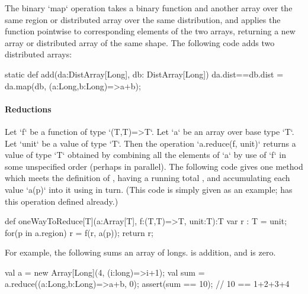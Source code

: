 The binary \xcd`map` operation takes a binary function and
another
array over the same region or distributed array over the same  distribution,
and applies the function 
pointwise to corresponding elements of the two arrays, returning
a new array or distributed array of the same shape.
The following code adds two distributed arrays: 
\begin{xten}
static def add(da:DistArray[Long], db: DistArray[Long])
    {da.dist==db.dist}
    = da.map(db, (a:Long,b:Long)=>a+b);
\end{xten}



\paragraph{Reductions}\label{ArrayReductions}

Let \xcd`f` be a function of type \xcd`(T,T)=>T`.  Let
\xcd`a` be an array over base type \xcd`T`.
Let \xcd`unit` be a value of type \xcd`T`.
Then the
operation \xcd`a.reduce(f, unit)` returns a value of type \xcd`T` obtained
by combining all the elements of \xcd`a` by use of  \xcd`f` in some unspecified order
(perhaps in parallel).   
The following code gives one method which 
meets the definition of ,
having a running total , and accumulating each value \xcd`a(p)` into it
using  in turn.  (This code is simply given as an example; 
has this operation defined already.)
\begin{xten}
def oneWayToReduce[T](a:Array[T], f:(T,T)=>T, unit:T):T {
  var r : T = unit;
  for(p in a.region) r = f(r, a(p));
  return r;
}
\end{xten}


For example,  the following sums an array of longs.   is addition,
and  is zero.  
\begin{xten}
val a = new Array[Long](4, (i:long)=>i+1);
val sum = a.reduce((a:Long,b:Long)=>a+b, 0); 
assert(sum == 10); // 10 == 1+2+3+4
\end{xten}


